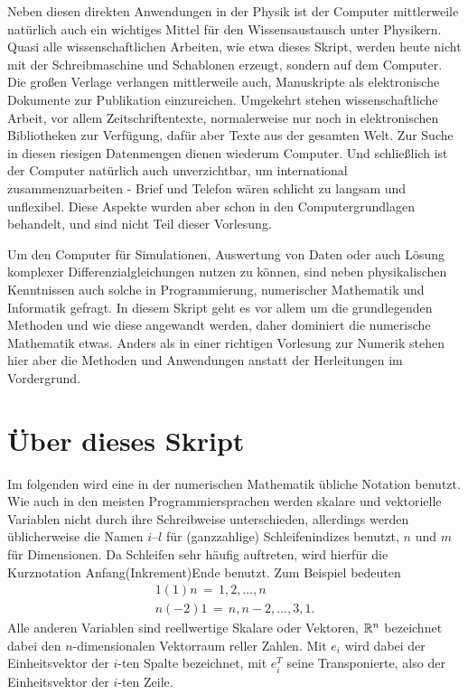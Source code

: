 Neben diesen direkten Anwendungen in der Physik ist der Computer
mittlerweile natürlich auch ein wichtiges Mittel für den
Wissensaustausch unter Physikern. Quasi alle wissenschaftlichen
Arbeiten, wie etwa dieses Skript, werden heute nicht mit der
Schreibmaschine und Schablonen erzeugt, sondern auf dem Computer. Die
großen Verlage verlangen mittlerweile auch, Manuskripte als
elektronische Dokumente zur Publikation einzureichen. Umgekehrt stehen
wissenschaftliche Arbeit, vor allem Zeitschriftentexte, normalerweise
nur noch in elektronischen Bibliotheken zur Verfügung, dafür aber
Texte aus der gesamten Welt. Zur Suche in diesen riesigen Datenmengen
dienen wiederum Computer. Und schließlich ist der Computer natürlich
auch unverzichtbar, um international zusammenzuarbeiten - Brief und
Telefon wären schlicht zu langsam und unflexibel. Diese Aspekte wurden
aber schon in den Computergrundlagen behandelt, und sind nicht Teil
dieser Vorlesung.

Um den Computer für Simulationen, Auswertung von Daten oder auch
Lösung komplexer Differenzialgleichungen nutzen zu können, sind neben
physikalischen Kenntnissen auch solche in Programmierung, numerischer
Mathematik und Informatik gefragt. In diesem Skript geht es vor allem
um die grundlegenden Methoden und wie diese angewandt werden, daher
dominiert die numerische Mathematik etwas. Anders als in einer
richtigen Vorlesung zur Numerik stehen hier aber die Methoden und
Anwendungen anstatt der Herleitungen im Vordergrund.

\section{Über dieses Skript}

Im folgenden wird eine in der numerischen Mathematik übliche Notation
benutzt. Wie auch in den meisten Programmiersprachen werden skalare
und vektorielle Variablen nicht durch ihre Schreibweise unterschieden,
allerdings werden üblicherweise die Namen $i$--$l$ für (ganzzahlige)
Schleifenindizes benutzt, $n$ und $m$ für Dimensionen. Da Schleifen sehr
häufig auftreten, wird hierfür die Kurznotation Anfang(Inkrement)Ende
benutzt. Zum Beispiel bedeuten
\begin{align*}
  1(1)n\,=\,1,2,\ldots, n\\
  n(-2)1\,=\,n, n-2,\ldots, 3, 1.
\end{align*}
Alle anderen Variablen sind reellwertige Skalare oder Vektoren,
$\mathbb{R}^n$ bezeichnet dabei den $n$-dimensionalen Vektorraum reller
Zahlen. Mit $e_i$ wird dabei der Einheitsvektor der $i$-ten Spalte
bezeichnet, mit $e_i^T$ seine Transponierte, also der Einheitsvektor
der $i$-ten Zeile.

